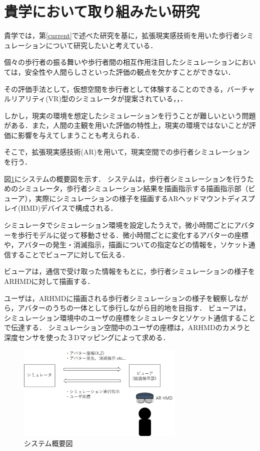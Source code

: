 \documentclass[twocolumn]{jarticle}%
\begin{document}
\section{貴学において取り組みたい研究}\label{want}
貴学では，第\ref{current}で述べた研究を基に，拡張現実感技術を用いた歩行者シミュレーションについて研究したいと考えている．

個々の歩行者の振る舞いや歩行者間の相互作用注目したシミュレーションにおいては，安全性や人間らしさといった評価の観点を欠かすことができない．

その評価手法として，仮想空間を歩行者として体験することのできる，バーチャルリアリティ(VR)型のシミュレータが提案されている\cite{Iryo-1}，\cite{Iryo-2}，\cite{Iryo-3}．

しかし，現実の環境を想定したシミュレーションを行うことが難しいという問題がある．また，人間の主観を用いた評価の特性上，現実の環境ではないことが評価に影響を与えてしまうことも考えられる．

そこで，拡張現実感技術(AR)を用いて，現実空間での歩行者シミュレーションを行う．

図\ref{fig:systemImage}にシステムの概要図を示す．
システムは，歩行者シミュレーションを行うためのシミュレータ，歩行者シミュレーション結果を描画指示する描画指示部（ビューア），実際にシミュレーションの様子を描画するARヘッドマウントディスプレイ(HMD)デバイスで構成される．

シミュレータでシミュレーション環境を設定したうえで，微小時間ごとにアバターを歩行モデルに従って移動させる．微小時間ごとに変化するアバターの座標や，アバターの発生・消滅指示，描画についての指定などの情報を，ソケット通信することでビューアに対して伝える．

ビューアは，通信で受け取った情報をもとに，歩行者シミュレーションの様子をARHMDに対して描画する．

ユーザは，ARHMDに描画される歩行者シミュレーションの様子を観察しながら，アバターのうちの一体として歩行しながら目的地を目指す．
ビューアは，シミュレーション環境中のユーザの座標をシミュレータとソケット通信することで伝達する．
シミュレーション空間中のユーザの座標は，ARHMDのカメラと深度センサを使った３Dマッピングによって求める．

\begin{figure}[htbp]
  \begin{center}
    \includegraphics[width=80mm]{images/systemImage.jpg}
  \end{center}
    \caption{システム概要図}
    \label{fig:systemImage}
\end{figure}
\end{document}
